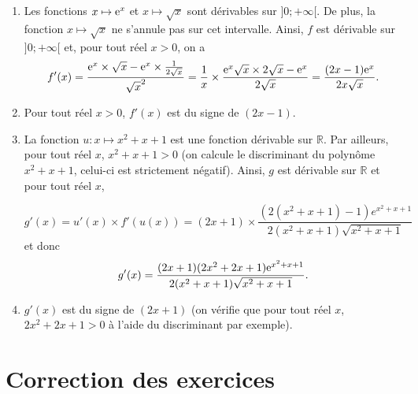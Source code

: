 \documentclass[11pt,fleqn, openany]{book} %
\begin{document}
\begin{solution}\vspace{0pt}
\begin{enumerate}\item  Les fonctions \(x \mapsto \mathrm{e}^x\) et \(x\mapsto \sqrt{x}\) sont dérivables sur \(]0;+\infty[\). De plus, la fonction \(x \mapsto \sqrt{x}\) ne s'annule pas sur cet intervalle. Ainsi, \(f\) est dérivable sur \(]0;+\infty[\) et, pour tout réel \(x>0\), on a 
\[f'(x)= \dfrac{\mathrm{e}^x \times \sqrt{x} - \mathrm{e}^x \times \frac{1}{2\sqrt{x}}}{\sqrt{x}^2} = \dfrac{1}{x} \times \dfrac{\mathrm{e}^x\sqrt{x} \times 2 \sqrt{x} - \mathrm{e}^x}{2\sqrt{x}} = \dfrac{(2x-1)\mathrm{e}^x}{2x\sqrt{x}}.\]

\item Pour tout réel \(x>0\), \(f'(x)\) est du signe de \((2x-1)\).

\begin{center}
\end{center}


\item La fonction \(u : x\mapsto x^2+x+1\) est une fonction dérivable sur \(\mathbb{R}\). Par ailleurs, pour tout réel \(x\), \(x^2+x+1>0\) (on calcule le discriminant du polynôme \(x^2+x+1\), celui-ci est strictement négatif). Ainsi, \(g\) est dérivable sur \(\mathbb{R}\) et pour tout réel \(x\),

\[g'(x)= u'(x) \times f'(u(x)) = (2x+1) \times \dfrac{(2(x^2+x+1)-1)e^{x^2+x+1}}{2(x^2+x+1)\sqrt{x^2+x+1}}\]
et donc
\[g'(x)= \dfrac{(2x+1)(2x^2+2x+1)\mathrm{e}^{x^2+x+1}}{2(x^2+x+1)\sqrt{x^2+x+1}} .\]
\item \(g'(x)\) est du signe de \((2x+1)\) (on vérifie que pour tout réel \(x\), \(2x^2+2x+1 > 0\) à l'aide du discriminant par exemple).

\begin{center}
\end{center}
\end{enumerate}
\end{solution}



\chapter{Correction des exercices}


\printsolutions[headings={false} ]
\end{document}

